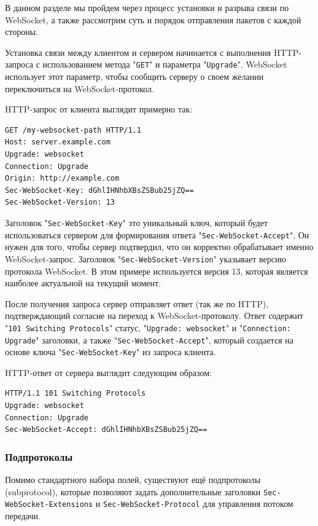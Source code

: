 В данном разделе мы пройдем через процесс установки и разрыва связи по WebSocket, а также рассмотрим суть и порядок отправления пакетов с каждой стороны.

Установка связи между клиентом и сервером начинается с выполнения HTTP-запроса с использованием метода "\texttt{GET}" и параметра "\texttt{Upgrade}". WebSocket использует этот параметр, чтобы сообщить серверу о своем желании переключиться на WebSocket-протокол.  

HTTP-запрос от клиента выглядит примерно так:

\begin{lstlisting}[style=CommandLineStyle]
GET /my-websocket-path HTTP/1.1
Host: server.example.com
Upgrade: websocket
Connection: Upgrade
Origin: http://example.com
Sec-WebSocket-Key: dGhlIHNhbXBsZSBub25jZQ==
Sec-WebSocket-Version: 13
\end{lstlisting}


Заголовок "\texttt{Sec-WebSocket-Key}" это уникальный ключ, который будет использоваться сервером для формирования ответа "\texttt{Sec-WebSocket-Accept}". Он нужен для того, чтобы сервер подтвердил, что он корректно обрабатывает именно WebSocket-запрос. Заголовок "\texttt{Sec-WebSocket-Version}" указывает версию протокола WebSocket. В этом примере используется версия 13, которая является наиболее актуальной на текущий момент.

После получения запроса сервер отправляет ответ (так же по HTTP), подтверждающий согласие на переход к WebSocket-протоколу. Ответ содержит "\texttt{101 Switching Protocols}" статус, "\texttt{Upgrade: websocket}" и "\texttt{Connection: Upgrade}" заголовки, а также "\texttt{Sec-WebSocket-Accept}", который создается на основе ключа "\texttt{Sec-WebSocket-Key}" из запроса клиента.

HTTP-ответ от сервера выглядит следующим образом:

\begin{lstlisting}[style=CommandLineStyle]
HTTP/1.1 101 Switching Protocols
Upgrade: websocket
Connection: Upgrade
Sec-WebSocket-Accept: dGhlIHNhbXBsZSBub25jZQ==
\end{lstlisting}

\subsubsection{Подпротоколы}

Помимо стандартного набора полей, существуют ещё подпротоколы (subprotocol), которые позволяют задать дополнительные заголовки \texttt{Sec-WebSocket-Extensions} и \texttt{Sec-WebSocket-Protocol} для управления потоком передачи.

